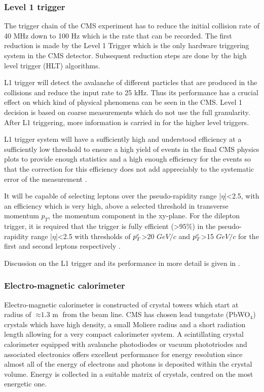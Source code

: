 \documentclass[a4paper,12pt,titlepage]{article}
\begin{document}
\subsubsection{Level 1 trigger}
The trigger chain of the CMS experiment has to reduce the initial collision rate of 40 MHz down to 100 Hz which is the rate that can be recorded. The first reduction is made by the Level 1 Trigger which is the only hardware triggering system in the CMS detector. Subsequent reduction steps are done by the high level trigger (HLT) algorithms.

L1 trigger will detect the avalanche of different particles that are produced in the collisions and reduce the input rate to 25 kHz. Thus its performance has a crucial effect on which kind of physical phenomena can be seen in the CMS. Level 1 decision is based on coarse measurements which do not use the full granularity. After L1 triggering, more information is carried in for the higher level triggers.

L1 trigger system will have a sufficiently high and understood efficiency at a sufficiently low threshold to ensure a high yield of events in the final CMS physics plots to provide enough statistics and a high enough efficiency for the events so that the correction for this efficiency does not add appreciably to the systematic error of the measurement \cite{TechPropCMS}.

It will be capable of selecting leptons over the pseudo-rapidity range |$\eta$|<2.5, with an efficiency which is very high, above a selected threshold in transverse momentum $p_T$, the momentum component in the xy-plane. For the dilepton trigger, it is required that the trigger is fully efficient (>$95\%$) in the pseudo-rapidity range |$\eta$|<2.5 with thresholds of $\mbox{${p^e_T}$}$>20 $GeV/c$ and $\mbox{${p^e_T}$}$>15 $GeV/c$ for the first and second leptons respectively \cite{L1Trigger}.

Discussion on the L1 trigger and its performance in more detail is given in \cite{L1Trigger}.

\subsubsection{Electro-magnetic calorimeter}
Electro-magnetic calorimeter is constructed of crystal towers which start at radius of $\approx \mbox{1.3 m}$ from the beam line. CMS has chosen lead tungstate (PbWO$_{4}$) crystals which have high density, a small Moliere radius and a short radiation length allowing for a very compact calorimeter system. A scintillating crystal calorimeter equipped with avalanche photodiodes or vacuum phototriodes and associated electronics offers excellent performance for energy resolution since almost all of the energy of electrons and photons is deposited within the crystal volume. Energy is collected in a suitable matrix of crystals, centred on the most energetic one.
\end{document}

